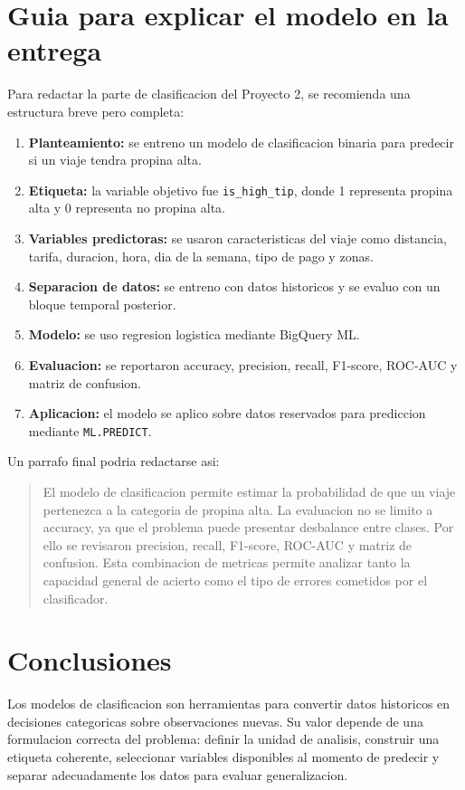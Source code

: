 \documentclass[12pt]{article}
\begin{document}
\section{Guia para explicar el modelo en la entrega}
Para redactar la parte de clasificacion del Proyecto 2, se recomienda una estructura breve pero completa:
\begin{enumerate}[label=\textbf{R\arabic*.}, leftmargin=*]
\item \textbf{Planteamiento:} se entreno un modelo de clasificacion binaria para predecir si un viaje tendra propina alta.
\item \textbf{Etiqueta:} la variable objetivo fue \texttt{is\_high\_tip}, donde 1 representa propina alta y 0 representa no propina alta.
\item \textbf{Variables predictoras:} se usaron caracteristicas del viaje como distancia, tarifa, duracion, hora, dia de la semana, tipo de pago y zonas.
\item \textbf{Separacion de datos:} se entreno con datos historicos y se evaluo con un bloque temporal posterior.
\item \textbf{Modelo:} se uso regresion logistica mediante BigQuery ML.
\item \textbf{Evaluacion:} se reportaron accuracy, precision, recall, F1-score, ROC-AUC y matriz de confusion.
\item \textbf{Aplicacion:} el modelo se aplico sobre datos reservados para prediccion mediante \texttt{ML.PREDICT}.
\end{enumerate}

Un parrafo final podria redactarse asi:

\begin{quote}
El modelo de clasificacion permite estimar la probabilidad de que un viaje pertenezca a la categoria de propina alta. La evaluacion no se limito a accuracy, ya que el problema puede presentar desbalance entre clases. Por ello se revisaron precision, recall, F1-score, ROC-AUC y matriz de confusion. Esta combinacion de metricas permite analizar tanto la capacidad general de acierto como el tipo de errores cometidos por el clasificador.
\end{quote}

\section{Conclusiones}
Los modelos de clasificacion son herramientas para convertir datos historicos en decisiones categoricas sobre observaciones nuevas. Su valor depende de una formulacion correcta del problema: definir la unidad de analisis, construir una etiqueta coherente, seleccionar variables disponibles al momento de predecir y separar adecuadamente los datos para evaluar generalizacion.
\end{document}
